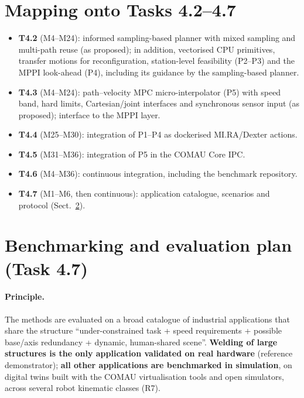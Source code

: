 \documentclass[10pt,a4paper]{article}
\begin{document}
\section{Mapping onto Tasks 4.2--4.7}
\begin{itemize}
\item \textbf{T4.2} (M4--M24): informed sampling-based planner with mixed sampling and multi-path reuse (as proposed); in addition, vectorised CPU primitives, transfer motions for reconfiguration, station-level feasibility (P2--P3) and the MPPI look-ahead (P4), including its guidance by the sampling-based planner.
\item \textbf{T4.3} (M4--M24): path--velocity MPC micro-interpolator (P5) with speed band, hard limits, Cartesian/joint interfaces and synchronous sensor input (as proposed); interface to the MPPI layer.
\item \textbf{T4.4} (M25--M30): integration of P1--P4 as dockerised MI.RA/Dexter actions.
\item \textbf{T4.5} (M31--M36): integration of P5 in the COMAU Core IPC.
\item \textbf{T4.6} (M4--M36): continuous integration, including the benchmark repository.
\item \textbf{T4.7} (M1--M6, then continuous): application catalogue, scenarios and protocol (Sect.~\ref{sec:bench}).
\end{itemize}

\section{Benchmarking and evaluation plan (Task 4.7)}\label{sec:bench}
\paragraph{Principle.} The methods are evaluated on a broad catalogue of industrial applications that share the structure ``under-constrained task + speed requirements + possible base/axis redundancy + dynamic, human-shared scene''. \textbf{Welding of large structures is the only application validated on real hardware} (reference demonstrator); \textbf{all other applications are benchmarked in simulation}, on digital twins built with the COMAU virtualisation tools and open simulators, across several robot kinematic classes (R7).
\end{document}
